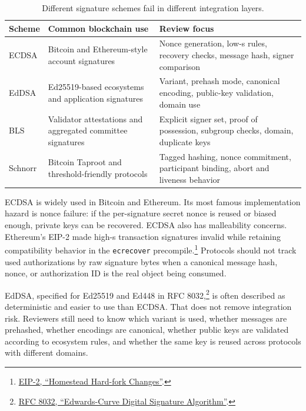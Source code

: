 \begin{table}[htbp]
\centering
\small
\renewcommand{\arraystretch}{1.18}
\begin{tabularx}{\textwidth}{@{}>{\RaggedRight\arraybackslash}p{}>{\RaggedRight\arraybackslash}p{}X@{}}
\toprule
Scheme & Common blockchain use & Review focus \\
\midrule
ECDSA & Bitcoin and Ethereum-style account signatures & Nonce generation, low-s rules, recovery checks, message hash, signer comparison \\
EdDSA & Ed25519-based ecosystems and application signatures & Variant, prehash mode, canonical encoding, public-key validation, domain use \\
BLS & Validator attestations and aggregated committee signatures & Explicit signer set, proof of possession, subgroup checks, domain, duplicate keys \\
Schnorr & Bitcoin Taproot and threshold-friendly protocols & Tagged hashing, nonce commitment, participant binding, abort and liveness behavior \\
\bottomrule
\end{tabularx}
\caption{Different signature schemes fail in different integration layers.}
\end{table}

ECDSA is widely used in Bitcoin and Ethereum. Its most famous implementation hazard is nonce failure: if the per-signature secret nonce is reused or biased enough, private keys can be recovered. ECDSA also has malleability concerns. Ethereum's EIP-2 made high-s transaction signatures invalid while retaining compatibility behavior in the \texttt{ecrecover} precompile.\footnote{\href{https://eips.ethereum.org/EIPS/eip-2}{EIP-2, ``Homestead Hard-fork Changes''}.} Protocols should not track used authorizations by raw signature bytes when a canonical message hash, nonce, or authorization ID is the real object being consumed.

EdDSA, specified for Ed25519 and Ed448 in RFC 8032,\footnote{\href{https://datatracker.ietf.org/doc/html/rfc8032}{RFC 8032, ``Edwards-Curve Digital Signature Algorithm''}.} is often described as deterministic and easier to use than ECDSA. That does not remove integration risk. Reviewers still need to know which variant is used, whether messages are prehashed, whether encodings are canonical, whether public keys are validated according to ecosystem rules, and whether the same key is reused across protocols with different domains.

